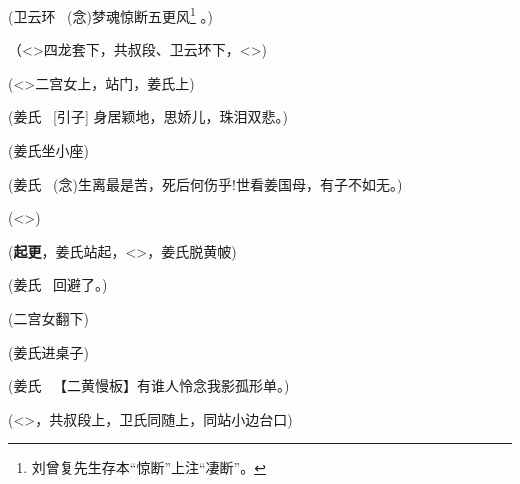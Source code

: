 (卫云环\hspace{15pt}~ ({\akai 念})梦魂惊断五更风\footnote{刘曾复先生存本``惊断''上注``凄断''。}%
。)

（\textless{}\!\textgreater{}{\hwfs 四}龙套{\hwfs 下}，共叔段、卫云环{\hwfs 下}，\textless{}\!\textgreater{})

\vspace{5pt}

(\textless{}\!\textgreater{}{\hwfs 二}宫女{\hwfs 上}，{\hwfs 站门}，姜氏{\hwfs 上})

(姜氏\hspace{25pt}~ {[}{\akai 引子}{]} 身居颖地，思娇儿，珠泪双悲。)

(姜氏坐{\hwfs 小座})

(姜氏\hspace{25pt}~ ({\akai 念})生离最是苦，死后何伤乎!世看姜国母，有子不如无。)


(\textless{}\!\textgreater{})


({\bfseries\akai 起更}，姜氏{\hwfs 站起}，\textless{}\!\textgreater{}，姜氏{\hwfs 脱黄帔})

(姜氏\hspace{25pt}~ 回避了。)

({\hwfs 二}宫女{\hwfs 翻下})


(姜氏{\hwfs 进桌子})

(姜氏\hspace{25pt}~ 【{\akai 二黄慢板}】有谁人怜念我影孤形单。)

(\textless{}\!\textgreater{}，共叔段{\hwfs 上}，卫氏{\hwfs 同随上}，{\hwfs 同站小边台口})

